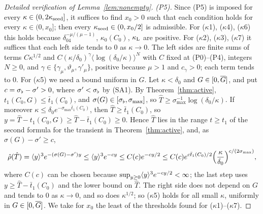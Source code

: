\begin{proof}[Detailed verification of Lemma~\ref{lem:nonempty}]
\emph{(P5).} Since (P5) is imposed for every $\kappa\in(0,2\kappa_{\mathrm{seed}}]$, it suffices
to find $x_0>0$ such that each condition holds for every $\kappa\in(0,x_0]$; then every $\kappa_{\mathrm{seed}}\in(0,x_0/2]$ is admissible. For ($\kappa$1), ($\kappa$4), ($\kappa$6) this holds
because $\delta_04^{-\mu/(\mu-1)}$, $\kappa_0(C_0)$, $\kappa_{\mathrm{L}}$ are positive. For
($\kappa$2), ($\kappa$3), ($\kappa$7) it suffices that each left side tends to
$0$ as $\kappa\to0$. The left sides are finite sums of terms $C\kappa^{1/2}$ and
$C(\kappa/\delta_0)^\gamma\langle\log(\delta_0/\kappa)\rangle^N$ with $C$ fixed at
(P0)--(P4), integers $N\ge0$, and
$\gamma\in\{\gamma_\mu,\vartheta_\mu,\gamma'_\mu\}$, positive because $\mu>1$ and
$c_\gamma>0$; each term tends to $0$. For ($\kappa$5) we need a bound uniform in
$G$. Let $\kappa<\delta_0$ and $G\in[0,\overline{G}]$, and put $c=\sigma_\flat-\sigma'>0$, where
$\sigma'<\sigma_\flat$ by (SA1). By Theorem~\ref{thm:active},
$t_1(C_0,G)\le\bar t_1(C_0)$, and $\sigma(G)\in[\sigma_\flat,\sigma_{\max}]$, so
$\hat T\ge\sigma_{\max}^{-1}\log(\delta_0/\kappa)$. If moreover
$\kappa\le\delta_0e^{-\sigma_{\max}\bar t_1(C_0)}$, then $\hat T\ge\bar t_1(C_0)$, so
$y=\hat T-t_1(C_0,G)\ge\hat T-\bar t_1(C_0)\ge0$. Hence $\hat T$ lies in the range
$t\ge t_1$ of the second formula for the transient in Theorem~\ref{thm:active},
and, as $\sigma(G)-\sigma'\ge c$,
\[
\hat\rho(\hat T)=\langle y\rangle^3e^{-(\sigma(G)-\sigma')y}\le\langle y\rangle^3e^{-cy}\le C(c)e^{-cy/2}
\le C(c)e^{c\bar t_1(C_0)/2}\Big(\frac\kappa{\delta_0}\Big)^{c/(2\sigma_{\max})},
\]
where $C(c)$ can be chosen because $\sup_{y\ge0}\langle y\rangle^3e^{-cy/2}<\infty$; the last step uses
$y\ge\hat T-\bar t_1(C_0)$ and the lower bound on $\hat T$. The right side does not depend on
$G$ and tends to $0$ as $\kappa\to0$, and so does $\kappa^{1/2}$; so ($\kappa$5)
holds for all small $\kappa$, uniformly in $G\in[0,\overline{G}]$. We take for $x_0$
the least of the thresholds found for ($\kappa$1)--($\kappa$7).


\end{proof}
